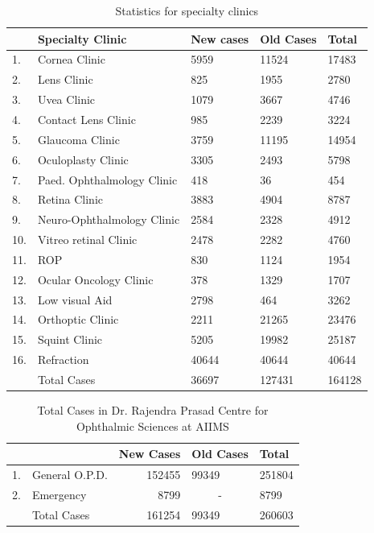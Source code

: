 \documentclass[12pt,a4paper]{report}
\begin{document}
\begin{table}[]
\centering
\caption{Statistics for specialty clinics \cite{rpc}}
\label{my-label}
\begin{tabular}{|l|l|l|l|l|}
\hline
    & Specialty Clinic           & New cases & Old Cases & Total  \\ \hline
1.   & Cornea Clinic              & 5959      & 11524     & 17483  \\ \hline
2.  & Lens Clinic                & 825       & 1955      & 2780   \\ \hline
3.   & Uvea Clinic                & 1079      & 3667      & 4746   \\ \hline
4.   & Contact Lens Clinic        & 985       & 2239      & 3224   \\ \hline
5.   & Glaucoma Clinic            & 3759      & 11195     & 14954  \\ \hline
6.   & Oculoplasty Clinic         & 3305      & 2493      & 5798   \\ \hline
7.   & Paed. Ophthalmology Clinic & 418       & 36        & 454    \\ \hline
8.   & Retina Clinic              & 3883      & 4904      & 8787   \\ \hline
9.   & Neuro-Ophthalmology Clinic & 2584      & 2328      & 4912   \\ \hline
10. & Vitreo retinal Clinic      & 2478      & 2282      & 4760   \\ \hline
11. & ROP                        & 830       & 1124      & 1954   \\ \hline
12.  & Ocular Oncology Clinic     & 378       & 1329      & 1707   \\ \hline
13.  & Low visual Aid             & 2798      & 464       & 3262   \\ \hline
14.  & Orthoptic Clinic           & 2211      & 21265     & 23476  \\ \hline
15.  & Squint Clinic              & 5205      & 19982     & 25187  \\ \hline
16.  & Refraction                 & 40644     & 40644     & 40644  \\ \hline
    & Total Cases                & 36697     & 127431    & 164128 \\ \hline
\end{tabular}
\end{table}
\begin{table}[]
\centering
\caption{Total Cases in Dr. Rajendra Prasad Centre for Ophthalmic Sciences at AIIMS \cite{rpc}}
\label{my-label}
\begin{tabular}{|l|l|r|l|l|}
\hline
\multicolumn{2}{|c|}{} & New Cases & Old Cases              & Total  \\ \hline
1.   & General O.P.D.  & 152455   & 99349                  & 251804 \\ \hline
2.   & Emergency       & 8799     & \multicolumn{1}{c|}{-} & 8799   \\ \hline
     & Total Cases     & 161254   & 99349                  & 260603 \\ \hline
\end{tabular}
\end{table}
\end{document}
